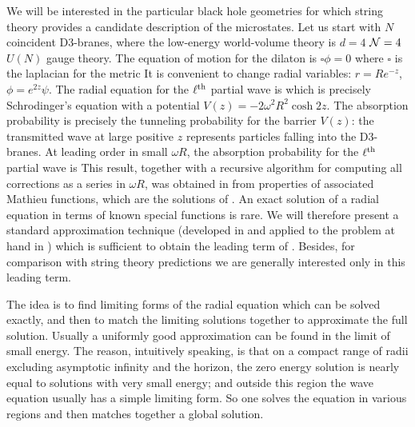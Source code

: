We will be interested in the particular black hole geometries for which
string theory provides a candidate description of the microstates.  Let us
start with $N$ coincident D3-branes, where the low-energy world-volume
theory is $d=4$ ${\cal N}=4$ $U(N)$ gauge theory.  The equation of motion
for the dilaton is $\square\phi = 0$ where $\square$ is the laplacian for
the metric 
 It is convenient to change radial variables: $r = R e^{-z}$, $\phi =
e^{2z} \psi$.  The radial equation for the $\ell^{\rm th}$ partial wave is
 which is precisely Schrodinger's equation with a potential $V(z) = - 2
\omega^2 R^2 \cosh 2z$.  The absorption probability is precisely the
tunneling probability for the barrier $V(z)$: the transmitted wave at large
positive $z$ represents particles falling into the D3-branes.  At leading
order in small $\omega R$, the absorption probability for the $\ell^{\rm
th}$ partial wave is
 This result, together with a recursive algorithm for computing all
corrections as a series in $\omega R$, was obtained in \cite{Gubser:1998iu}
from properties of associated Mathieu functions, which are the solutions of
\LthPartial.  An exact solution of a radial equation in terms of known
special functions is rare.  We will therefore present a standard
approximation technique (developed in \cite{Unruh:1976fm} and applied to
the problem at hand in \cite{Klebanov:1997kc}) which is sufficient to
obtain the leading term of \LowCross.  Besides, for comparison with string
theory predictions we are generally interested only in this leading term.

The idea is to find limiting forms of the radial equation which can be
solved exactly, and then to match the limiting solutions together to
approximate the full solution.  Usually a uniformly good approximation can
be found in the limit of small energy.  The reason, intuitively speaking,
is that on a compact range of radii excluding asymptotic infinity and the
horizon, the zero energy solution is nearly equal to solutions with very
small energy; and outside this region the wave equation usually has a
simple limiting form.  So one solves the equation in various regions and
then matches together a global solution.


